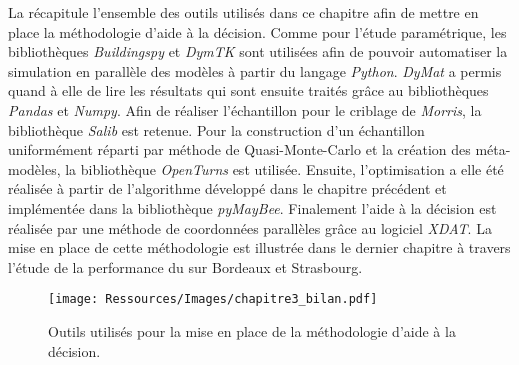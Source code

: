La  récapitule l’ensemble des outils utilisés dans ce chapitre
afin de mettre en place la méthodologie d’aide à la décision. Comme pour l’étude
paramétrique, les bibliothèques \textit{Buildingspy} et \textit{DymTK} sont utilisées
afin de pouvoir automatiser la simulation en parallèle des modèles à partir du langage
\textit{Python}. \textit{DyMat} a permis quand à elle de lire les résultats qui sont
ensuite traités grâce au bibliothèques \textit{Pandas} et \textit{Numpy}. Afin de réaliser
l’échantillon pour le criblage de \textit{Morris}, la bibliothèque \textit{Salib} est retenue.
Pour la construction d’un échantillon uniformément réparti par méthode de Quasi-Monte-Carlo
et la création des méta-modèles, la bibliothèque \textit{OpenTurns} est utilisée.
Ensuite, l’optimisation a elle été réalisée à partir de l’algorithme développé dans le chapitre
précédent et implémentée dans la bibliothèque \textit{pyMayBee}. Finalement l’aide à la
décision est réalisée par une méthode de coordonnées parallèles grâce au logiciel
\textit{XDAT}.
La mise en place de cette méthodologie est illustrée dans le dernier chapitre à travers l’étude
de la performance du  sur Bordeaux et Strasbourg.

\begin{figure}
    \centering
    \texttt{[image: Ressources/Images/chapitre3\_bilan.pdf]}
    \caption[Outils utilisés pour la mise en place de la méthodologie d’aide à la décision]
            {Outils utilisés pour la mise en place de la méthodologie d’aide à la décision.}
    \label{fig:outils_methode}
\end{figure}

